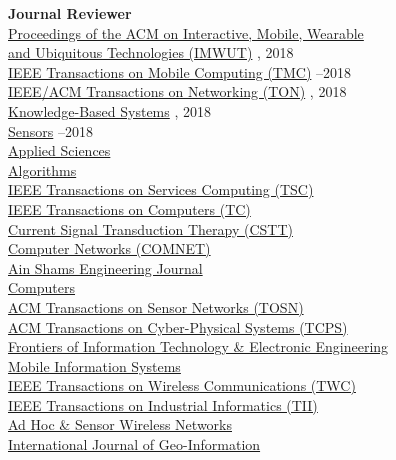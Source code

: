 {\bf Journal Reviewer}\\
{\href{https://imwut.acm.org}{Proceedings of the ACM on Interactive, Mobile, Wearable \\\mbox{\hspace{0.6cm}} and Ubiquitous Technologies (IMWUT)}} , 2018\\
{\href{https://www.computer.org/portal/web/tmc}{IEEE Transactions on Mobile Computing (TMC)}} --2018\\
{\href{http://ieeexplore.ieee.org/xpl/RecentIssue.jsp?punumber=90}{IEEE/ACM Transactions on Networking (TON)}} , 2018\\
{\href{https://www.journals.elsevier.com/knowledge-based-systems}{Knowledge-Based Systems}} , 2018\\
{\href{http://www.mdpi.com/journal/sensors}{Sensors}} --2018\\
{\href{http://www.mdpi.com/journal/applsci}{Applied Sciences}} \\
{\href{http://www.mdpi.com/journal/algorithms}{Algorithms}} \\
{\href{https://www.computer.org/web/tsc}{IEEE Transactions on Services Computing (TSC)}} \\
{\href{https://www.computer.org/web/tc}{IEEE Transactions on Computers (TC)}} \\
{\href{http://benthamscience.com/journals/current-signal-transduction-therapy/}{Current Signal Transduction Therapy (CSTT)}} \\
{\href{http://ees.elsevier.com/comnet/}{Computer Networks (COMNET)}} \\
{\href{https://www.journals.elsevier.com/ain-shams-engineering-journal}{Ain Shams Engineering Journal}} \\
{\href{http://www.mdpi.com/journal/computers}{Computers}} \\
{\href{http://tosn.acm.org/}{ACM Transactions on Sensor Networks (TOSN)}} \\
{\href{http://tcps.acm.org/}{ACM Transactions on Cyber-Physical Systems (TCPS)}} \\
{\href{http://www.springer.com/computer/journal/11714}{Frontiers of Information Technology \& Electronic Engineering}} \\
{\href{https://www.hindawi.com/journals/misy/}{Mobile Information Systems}} \\
{\href{http://www.comsoc.org/twc}{IEEE Transactions on Wireless Communications (TWC)}} \\
{\href{http://www.ieee-ies.org/pubs/transactions-on-industrial-informatics}{IEEE Transactions on Industrial Informatics (TII)}} \\
{\href{http://www.oldcitypublishing.com/AHSWN/AHSWN.html}{Ad Hoc \& Sensor Wireless Networks}} \\
{\href{http://www.mdpi.com/journal/ijgi}{International Journal of Geo-Information}} \\

